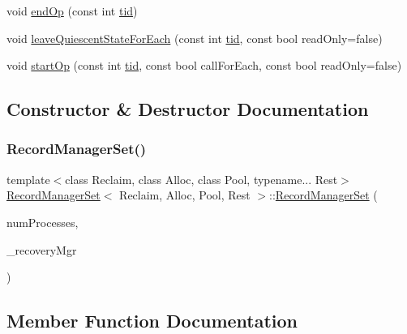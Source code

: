 \begin{DoxyCompactItemize}
\item 
void \hyperlink{classRecordManagerSet_a7a12979919638016acdad6a6d0e9f7d2}{end\+Op} (const int \hyperlink{microbench_2main_8cpp_a9ca9869868fe7e7a38a921cc7de4103f}{tid})
\item 
void \hyperlink{classRecordManagerSet_ac26e824b5b47eff1e2f1345b5cd11659}{leave\+Quiescent\+State\+For\+Each} (const int \hyperlink{microbench_2main_8cpp_a9ca9869868fe7e7a38a921cc7de4103f}{tid}, const bool read\+Only=false)
\item 
void \hyperlink{classRecordManagerSet_a4cde1849fa081f1b83a82b3f77711ab9}{start\+Op} (const int \hyperlink{microbench_2main_8cpp_a9ca9869868fe7e7a38a921cc7de4103f}{tid}, const bool call\+For\+Each, const bool read\+Only=false)
\end{DoxyCompactItemize}


\subsection{Constructor \& Destructor Documentation}
\mbox{\label{classRecordManagerSet_a2a1dcedae6027d7a0c0b91cd02a3914e}} 
\subsubsection{\texorpdfstring{Record\+Manager\+Set()}{RecordManagerSet()}}
{\footnotesize\ttfamily template$<$class Reclaim, class Alloc, class Pool, typename... Rest$>$ \\
\hyperlink{classRecordManagerSet}{Record\+Manager\+Set}$<$ Reclaim, Alloc, Pool, Rest $>$\+::\hyperlink{classRecordManagerSet}{Record\+Manager\+Set} (\begin{DoxyParamCaption}\item[{const int}]{num\+Processes,  }\item[{\hyperlink{classRecoveryMgr}{Recovery\+Mgr}$<$ void $\ast$$>$ $\ast$const}]{\+\_\+recovery\+Mgr }\end{DoxyParamCaption})\hspace{0.3cm}{\ttfamily [inline]}}



\subsection{Member Function Documentation}
\mbox{\label{classRecordManagerSet_a7ea98e08390be42bcce2692fdb78530d}} 
